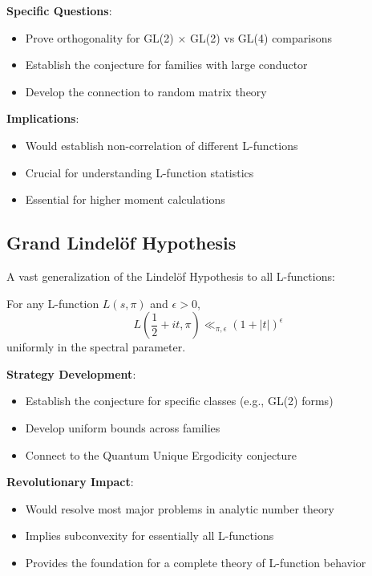 \begin{research_problem}
\textbf{Specific Questions}:
\begin{itemize}
\item Prove orthogonality for GL(2) × GL(2) vs GL(4) comparisons
\item Establish the conjecture for families with large conductor
\item Develop the connection to random matrix theory
\end{itemize}

\textbf{Implications}:
\begin{itemize}
\item Would establish non-correlation of different L-functions
\item Crucial for understanding L-function statistics
\item Essential for higher moment calculations
\end{itemize}
\end{research_problem}

\subsection{Grand Lindelöf Hypothesis}
\label{subsec:grand_lindelof}

A vast generalization of the Lindelöf Hypothesis to all L-functions:

\begin{conjecture}
For any L-function $L(s, \pi)$ and $\epsilon > 0$,
\begin{equation}
L\left(\frac{1}{2} + it, \pi\right) \ll_{\pi,\epsilon} (1 + |t|)^\epsilon
\end{equation}
uniformly in the spectral parameter.
\end{conjecture}

\begin{research_problem}
\textbf{Strategy Development}:
\begin{itemize}
\item Establish the conjecture for specific classes (e.g., GL(2) forms)
\item Develop uniform bounds across families
\item Connect to the Quantum Unique Ergodicity conjecture
\end{itemize}

\textbf{Revolutionary Impact}:
\begin{itemize}
\item Would resolve most major problems in analytic number theory
\item Implies subconvexity for essentially all L-functions
\item Provides the foundation for a complete theory of L-function behavior
\end{itemize}
\end{research_problem}

